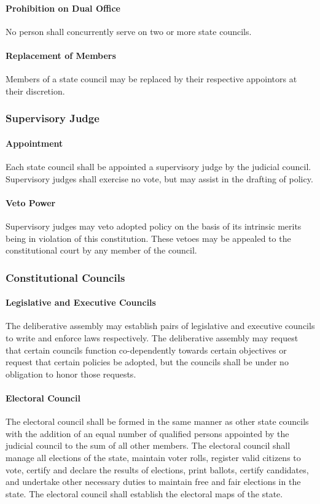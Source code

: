 \documentclass{article}
\begin{document}
\paragraph{Prohibition on Dual Office}
No person shall concurrently serve on two or more state councils.
\paragraph{Replacement of Members}
Members of a state council may be replaced by their respective appointors at their discretion.
\subsubsection{Supervisory Judge}
\paragraph{Appointment}
Each state council shall be appointed a supervisory judge by the judicial council. Supervisory judges shall exercise no vote, but may assist in the drafting of policy.
\paragraph{Veto Power}
Supervisory judges may veto adopted policy on the basis of its intrinsic merits being in violation of this constitution. These vetoes may be appealed to the constitutional court by any member of the council.
\subsubsection{Constitutional Councils}
\paragraph{Legislative and Executive Councils}
The deliberative assembly may establish pairs of legislative and executive councils to write and enforce laws respectively. The deliberative assembly may request that certain councils function co-dependently towards certain objectives or request that certain policies be adopted, but the councils shall be under no obligation to honor those requests.
\paragraph{Electoral Council}
The electoral council shall be formed in the same manner as other state councils with the addition of an equal number of qualified persons appointed by the judicial council to the sum of all other members. The electoral council shall manage all elections of the state, maintain voter rolls, register valid citizens to vote, certify and declare the results of elections, print ballots, certify candidates, and undertake other necessary duties to maintain free and fair elections in the state. The electoral council shall establish the electoral maps of the state.
\end{document}
